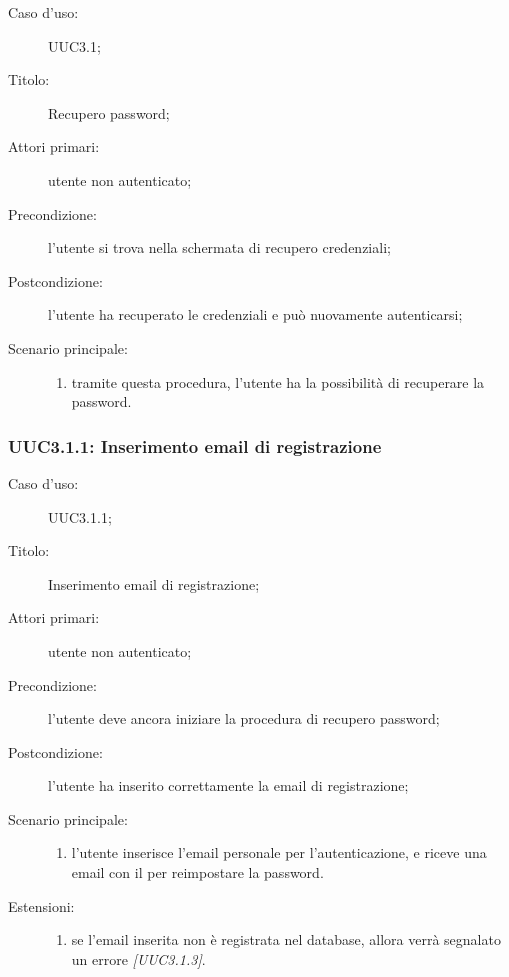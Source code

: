 \documentclass[../../../analisi-dei-requisiti.tex]{subfiles}
\begin{document}
\begin{description}
  \item[Caso d’uso:] UUC3.1;
  \item[Titolo:] Recupero password;
  \item[Attori primari:] utente non autenticato;
  \item[Precondizione:] l'utente si trova nella schermata di recupero credenziali;
  \item[Postcondizione:] l'utente ha recuperato le credenziali e può nuovamente autenticarsi;
  \item[Scenario principale:]
        \begin{enumerate}
          \item tramite questa procedura, l'utente ha la possibilità di recuperare la password.
        \end{enumerate}
\end{description}

\subsubsection{UUC3.1.1: Inserimento email di registrazione}%
\label{subs:UUC3.1.1}
\begin{description}
  \item[Caso d’uso:] UUC3.1.1;
  \item[Titolo:] Inserimento email di registrazione;
  \item[Attori primari:] utente non autenticato;
  \item[Precondizione:] l'utente deve ancora iniziare la procedura di recupero password;
  \item[Postcondizione:] l'utente ha inserito correttamente la email di registrazione;
  \item[Scenario principale:]
        \begin{enumerate}
          \item l'utente inserisce l'email personale per l'autenticazione, e riceve una email con il  per reimpostare la password.
        \end{enumerate}
  \item[Estensioni:]
        \begin{enumerate}
          \item se l'email inserita non è registrata nel database, allora verrà segnalato un errore \emph{[UUC3.1.3]}.
        \end{enumerate}
\end{description}
\end{document}
